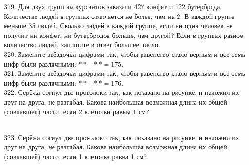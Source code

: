 \documentclass[12pt]{article}
\begin{document}
319. Для двух групп экскурсантов заказали 427 конфет и 122 бутерброда. Количество людей в группах отличается не более, чем на 2. В каждой группе меньше 35 людей. Сколько людей в каждой группе, если ни один человек не получит ни конфет, ни бутербродов больше, чем другой? Если в группах разное количество людей, запишите в ответ большее число.\\
320. Замените звёздочки цифрами так, чтобы равенство стало верным и все семь цифр были различными: $**+**=175.$\\
321. Замените звёздочки цифрами так, чтобы равенство стало верным и все семь цифр были различными: $**+**=176.$\\
322. Серёжа согнул две проволоки так, как показано на рисунке, и наложил их друг на друга, не разгибая. Какова наибольшая возможная длина их общей (совпавшей) части, если 2 клеточки равны 1 см?\\
\begin{figure}[ht!]
\end{figure}\\
323. Серёжа согнул две проволоки так, как показано на рисунке, и наложил их друг на друга, не разгибая. Какова наибольшая возможная длина их общей (совпавшей) части, если 1 клеточка равна 1 см?\\
\begin{figure}[ht!]
\end{figure}\\
\end{document}
